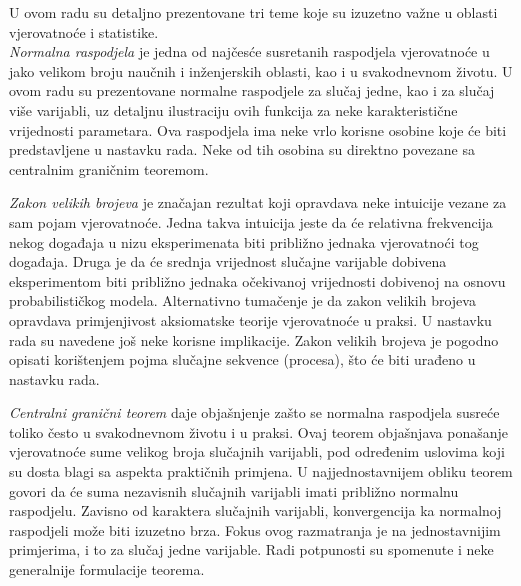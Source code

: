 
\indent
U ovom radu su detaljno prezentovane tri teme koje su izuzetno važne u oblasti
vjerovatnoće i statistike.  \\

\textit{Normalna raspodjela} je jedna od najčesće susretanih raspodjela vjerovatnoće u
jako velikom broju naučnih i inženjerskih oblasti, kao i u svakodnevnom životu.
U ovom radu su prezentovane normalne raspodjele za slučaj jedne, kao i za slučaj
više varijabli, uz detaljnu ilustraciju ovih funkcija za neke karakteristične
vrijednosti parametara. Ova raspodjela ima neke vrlo korisne osobine koje će
biti predstavljene u nastavku rada. Neke od tih osobina su direktno povezane sa
centralnim graničnim teoremom.

\textit{Zakon velikih brojeva} je značajan rezultat koji opravdava neke
intuicije vezane za sam pojam vjerovatnoće. Jedna takva intuicija jeste da će
relativna frekvencija nekog događaja u nizu eksperimenata biti približno jednaka
vjerovatnoći tog događaja. Druga je da će srednja vrijednost slučajne varijable
dobivena eksperimentom biti približno jednaka očekivanoj vrijednosti dobivenoj
na osnovu probabilističkog modela. Alternativno tumačenje je da zakon velikih
brojeva opravdava primjenjivost aksiomatske teorije vjerovatnoće u praksi. U
nastavku rada su navedene još neke korisne implikacije. Zakon velikih brojeva je
pogodno opisati korištenjem pojma slučajne sekvence (procesa), što će biti
urađeno u nastavku rada.

\textit{Centralni granični teorem} daje objašnjenje zašto se normalna raspodjela
susreće toliko često u svakodnevnom životu i u praksi. Ovaj teorem objašnjava
ponašanje vjerovatnoće sume velikog broja slučajnih varijabli, pod određenim
uslovima koji su dosta blagi sa aspekta praktičnih primjena. U najjednostavnijem
obliku teorem govori da će suma nezavisnih slučajnih varijabli imati približno
normalnu raspodjelu.  Zavisno od karaktera slučajnih varijabli, konvergencija ka
normalnoj raspodjeli može biti izuzetno brza. Fokus ovog razmatranja je na
jednostavnijim primjerima, i to za slučaj jedne varijable. Radi potpunosti su
spomenute i neke generalnije formulacije teorema. \\
